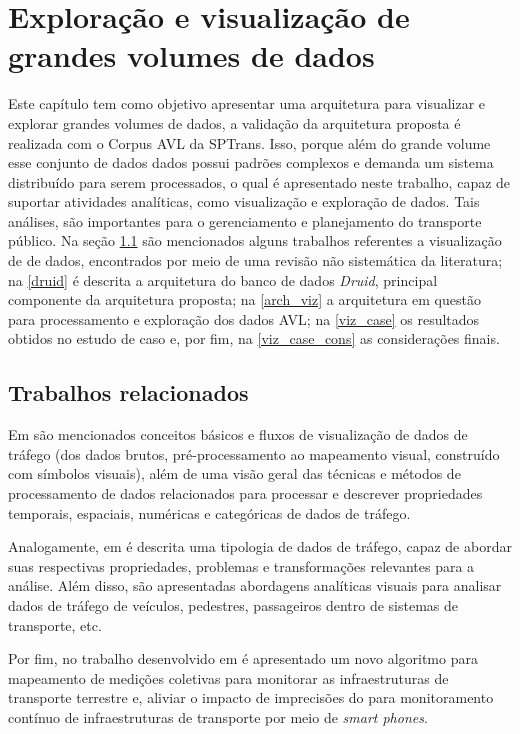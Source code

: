 \documentclass[
	12pt,				%
	oneside,			%
	a4paper,			%
	english,			%
	brazil				%
	]{abntex2ppgsi}
\begin{document}
\chapter{Exploração e visualização de grandes volumes de dados}
\label{dataViz}

Este capítulo tem como objetivo apresentar uma arquitetura para visualizar e explorar grandes volumes de dados, a validação da arquitetura proposta é realizada com o Corpus AVL da SPTrans. Isso, porque além do grande volume esse conjunto de dados dados possui padrões complexos e demanda um sistema distribuído para serem processados, o qual é apresentado neste trabalho, capaz de suportar atividades analíticas, como visualização e exploração de dados. Tais análises, são importantes para o gerenciamento e planejamento do transporte público. Na seção \ref{related_work_data_viz} são mencionados alguns trabalhos referentes a visualização de de dados, encontrados por meio de uma revisão não sistemática da literatura; na \ref{druid} é descrita a arquitetura do banco de dados \textit{Druid}, principal componente da arquitetura proposta; na \ref{arch_viz} a arquitetura em questão para processamento e exploração dos dados AVL; na \ref{viz_case} os resultados obtidos no estudo de caso e, por fim, na \ref{viz_case_cons} as considerações finais.

\section{Trabalhos relacionados}
\label{related_work_data_viz}

Em \cite{chen2015survey} são mencionados conceitos básicos e fluxos de visualização de dados de tráfego (dos dados brutos, pré-processamento ao mapeamento visual, construído com símbolos visuais), além de uma visão geral das técnicas e métodos de processamento de dados relacionados para processar e descrever propriedades temporais, espaciais, numéricas e categóricas de dados de tráfego.

Analogamente, em \cite{andrienko2017visual} é descrita uma tipologia de dados de tráfego, capaz de abordar suas respectivas propriedades, problemas e transformações relevantes para a análise. Além disso, são apresentadas abordagens analíticas visuais para analisar dados de tráfego de veículos, pedestres, passageiros dentro de sistemas de transporte, etc.

Por fim, no trabalho desenvolvido em \cite{seraj2017aggregation} é apresentado um novo algoritmo para mapeamento de medições coletivas para monitorar as infraestruturas de transporte terrestre e, aliviar o impacto de imprecisões do  para monitoramento contínuo de infraestruturas de transporte por meio de \textit{smart phones}.
\end{document}
